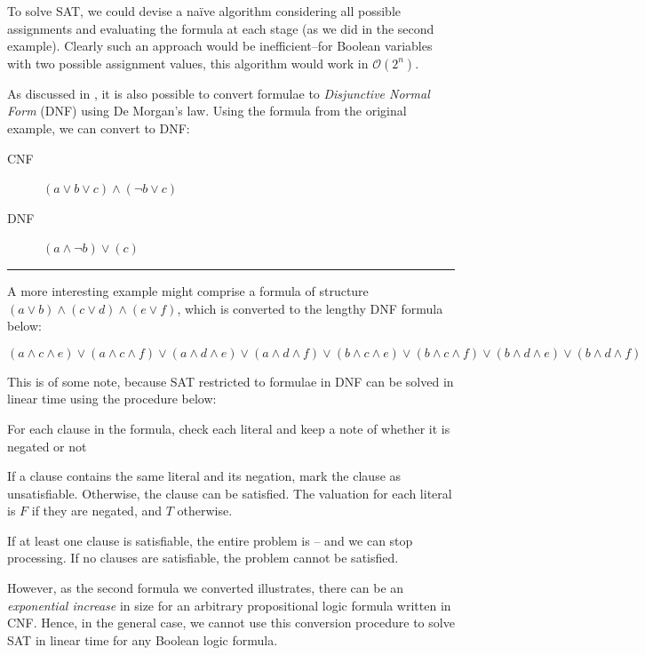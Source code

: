 \documentclass[a4paper,openany,12pt]{book}
\def \spacedrule {\textcolor{id7-aubergine}{\hrule}\vspace{1em}}
\begin{document}
To solve SAT, we could devise a naïve algorithm considering all possible assignments and evaluating the formula at each
stage (as we did in the second example).
Clearly such an approach would be inefficient--for Boolean variables with two possible assignment values, this algorithm
would work in $\mathcal{O}(2^n)$.

As discussed in \citet{miltersen2005converting}, it is also possible to convert formulae to \emph{Disjunctive Normal
Form} (DNF) using De Morgan's law.
Using the formula from the original example, we can convert to DNF:

    \begin{description}
        \item[CNF] \(
        (a \lor b \lor c) \land (\neg b \lor c)
        \)
        \item[DNF] \(
        (a \land \neg b) \lor (c)
        \)
    \end{description}
    
    \spacedrule{}
    
    A more interesting example might comprise a formula of structure  \(
    (a \lor b) \land (c \lor d) \land (e \lor f)
    \), which is converted to the lengthy DNF formula below:
    
    \[
    (a \land c \land e) \lor (a \land c \land f) \lor (a \land d \land e) \lor (a \land d \land 
    f) \lor (b \land c \land e) \lor (b \land c \land f) \lor (b \land d \land e) \lor (b \land d \land
    f)
    \]
    \vspace{0.25em}

This is of some note, because SAT restricted to formulae in DNF can be solved in linear time using the procedure below:

\begin{outline}
    \1 For each clause in the formula, check each literal and keep a note of whether it is negated or not

    \2 If a clause contains the same literal and its negation, mark the clause as unsatisfiable.
    \2 Otherwise, the clause can be satisfied. The valuation for each literal is $F$ if they are negated, and $T$
       otherwise.

    \1 If at least one clause is satisfiable, the entire problem is -- and we can stop processing.
    \1 If no clauses are satisfiable, the problem cannot be satisfied.
\end{outline}

However, as the second formula we converted illustrates, there can be an \emph{exponential increase} in size for an
arbitrary propositional logic formula written in CNF.
Hence, in the general case, we cannot use this conversion procedure to solve SAT in linear time for any Boolean logic
formula.
\end{document}
